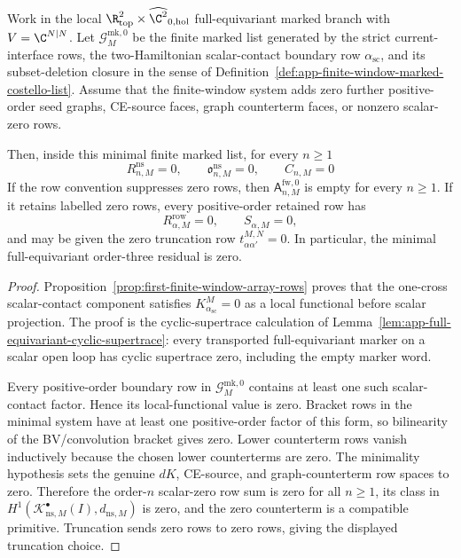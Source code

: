 \begin{thm}\label{thm:app-minimal-full-equivariant-all-order-vanishing}
  Work in the local
  \(\R^2_{\mathrm{top}}\times\widehat{\C^2}_{0,\mathrm{hol}}\)
  full-equivariant marked branch with \(V=\C^{N|N}\).  Let
  \(\mathcal G^{\mathrm{mk},0}_M\) be the finite marked list generated by
  the strict current-interface rows, the two-Hamiltonian scalar-contact
  boundary row \(\alpha_{\mathrm{sc}}\), and its subset-deletion closure in
  the sense of
  Definition~\ref{def:app-finite-window-marked-costello-list}.  Assume that
  the finite-window system adds zero further positive-order seed graphs,
  CE-source faces, graph counterterm faces, or nonzero scalar-zero rows.

  Then, inside this minimal finite marked list, for every \(n\geq1\)
  \[
    R^{\mathrm{ns}}_{n,M}=0,\qquad
    \mathfrak o^{\mathrm{ns}}_{n,M}=0,\qquad
    C_{n,M}=0
  \]
  If the row convention suppresses zero rows, then
  \(\mathsf A^{\mathrm{fw},0}_{n,M}\) is empty for every \(n\geq1\).  If it
  retains labelled zero rows, every positive-order retained row has
  \[
    R^{\mathrm{row}}_{\alpha,M}=0,\qquad
    S_{\alpha,M}=0,
  \]
  and may be given the zero truncation row
  \(t^{M,N}_{\alpha\alpha'}=0\).  In particular, the minimal
  full-equivariant order-three residual is zero.
\end{thm}

\begin{proof}
  Proposition~\ref{prop:first-finite-window-array-rows} proves that the
  one-cross scalar-contact component satisfies
  \(K^M_{\alpha_{\mathrm{sc}}}=0\) as a local functional before scalar
  projection.  The proof is the cyclic-supertrace calculation of
  Lemma~\ref{lem:app-full-equivariant-cyclic-supertrace}: every transported
  full-equivariant marker on a scalar open loop has cyclic supertrace zero,
  including the empty marker word.

  Every positive-order boundary row in
  \(\mathcal G^{\mathrm{mk},0}_M\) contains at least one such
  scalar-contact factor.  Hence its local-functional value is zero.  Bracket
  rows in the minimal system have at least one positive-order factor of this
  form, so bilinearity of the BV/convolution bracket gives zero.  Lower
  counterterm rows vanish inductively because the chosen lower counterterms
  are zero.  The minimality hypothesis sets the genuine \(dK\), CE-source,
  and graph-counterterm row spaces to zero.  Therefore the order-\(n\)
  scalar-zero row sum
  is zero for all \(n\geq1\), its class in
  \(H^1(\mathcal K^\bullet_{\mathrm{ns},M}(I),d_{\mathrm{ns},M})\) is zero,
  and the zero counterterm is a compatible primitive.  Truncation sends zero
  rows to zero rows, giving the displayed truncation choice.
\end{proof}

